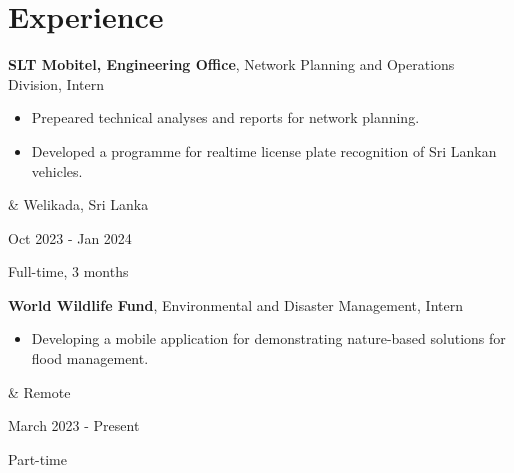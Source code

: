 \documentclass[10pt, a4paper]{article}
\newenvironment{highlights}{
        \begin{itemize}[
                topsep=0pt,
                parsep=0.10 cm,
                partopsep=0pt,
                itemsep=0pt,
                after=\vspace{-1\baselineskip},
                leftmargin=0.4 cm + 3pt
            ]
    }{
        \end{itemize}
    } %
\let\originalTabularx\tabularx
\let\originalEndTabularx\endtabularx
\renewenvironment{tabularx}{\bgroup\centering\originalTabularx}{\originalEndTabularx\par\egroup}
\begin{document}
\vspace{0.2 cm}
    \section{Experience}

        \begin{tabularx}{
            \textwidth-0.4 cm-0.13cm
        }{
            K{0.2 cm}
            R{4.1 cm}
        }
            \textbf{SLT Mobitel, Engineering Office}, Network Planning and Operations Division, Intern

            \vspace{0.10 cm}

            \begin{highlights}
	           \item Prepeared technical analyses and reports for network planning.
                \item Developed a programme for realtime license plate recognition of Sri Lankan vehicles.
            \end{highlights}
            &
            Welikada, Sri Lanka

            Oct 2023 - Jan 2024

            Full-time, 3 months
        \end{tabularx}
        
        \begin{tabularx}{
            \textwidth-0.4 cm-0.13cm
        }{
            K{0.2 cm}
            R{4.1 cm}
        }
            \textbf{World Wildlife Fund}, Environmental and Disaster Management, Intern

            \vspace{0.10 cm}

            \begin{highlights}
                \item Developing a mobile application for demonstrating nature-based solutions for flood management.
            \end{highlights}
            &
            Remote

            March 2023 - Present
            
            Part-time
        \end{tabularx}


%
%
%
%
    
\end{document}
